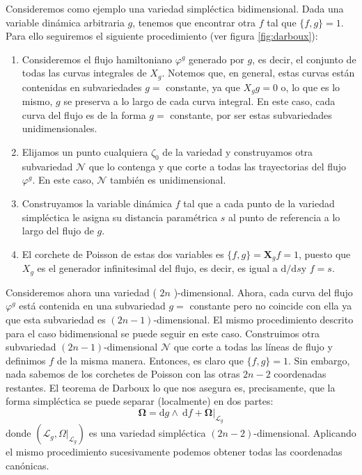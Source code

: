 Consideremos como ejemplo una variedad simpléctica bidimensional. Dada una variable dinámica arbitraria $g$, tenemos que encontrar otra $f$ tal que $\{f, g\}=1$. Para ello seguiremos el siguiente procedimiento (ver figura \ref{fig:darboux}):
\begin{enumerate}
  \item Consideremos el flujo hamiltoniano $\varphi^{g}$ generado por $g$, es decir, el conjunto de todas las curvas integrales de $X_{g}$. Notemos que, en general, estas curvas están contenidas en subvariedades $g=$ constante, ya que $X_{g} g=0$ o, lo que es lo mismo, $g$ se preserva a lo largo de cada curva integral. En este caso, cada curva del flujo es de la forma $g=$ constante, por ser estas subvariedades unidimensionales.
  \item Elijamos un punto cualquiera $\zeta_{0}$ de la variedad y construyamos otra subvariedad $\mathscr{N}$ que lo contenga y que corte a todas las trayectorias del flujo $\varphi^{g}$. En este caso, $\mathscr{N}$ también es unidimensional.
  \item Construyamos la variable dinámica $f$ tal que a cada punto de la variedad simpléctica le asigna su distancia paramétrica $s$ al punto de referencia a lo largo del flujo de $g$.
  \item El corchete de Poisson de estas dos variables es $\{f, g\}=\boldsymbol{X}_{g} f=1$, puesto que $X_{g}$ es el generador infinitesimal del flujo, es decir, es igual a $\mathrm{d} / \mathrm{d} s \mathrm{y}$ $f=s$.
\end{enumerate}


Consideremos ahora una variedad ( $2 n$ )-dimensional. Ahora, cada curva del flujo $\varphi^{g}$ está contenida en una subvariedad $g=$ constante pero no coincide con ella ya que esta subvariedad es $(2 n-1)$-dimensional. El mismo procedimiento descrito para el caso bidimensional se puede seguir en este caso. Construimos otra subvariedad $(2 n-1)$-dimensional $\mathscr{N}$ que corte a todas las líneas de flujo y definimos $f$ de la misma manera. Entonces, es claro que $\{f, g\}=1$. Sin embargo, nada sabemos de los corchetes de Poisson con las otras $2 n-2$ coordenadas restantes. El teorema de Darboux lo que nos asegura es, precisamente, que la forma simpléctica se puede separar (localmente) en dos partes:
$$
\begin{equation*}
\boldsymbol{\Omega}=\mathrm{d} g \wedge \mathrm{~d} f+\left.\boldsymbol{\Omega}\right|_{\mathscr{L}_{g}} \tag{2.9}
\end{equation*}
$$
donde $\left(\mathscr{L}_{g},\left.\Omega\right|_{\mathscr{L}_{g}}\right)$ es una variedad simpléctica  $\left(2 n-2\right)$-dimensional. Aplicando el mismo procedimiento sucesivamente podemos obtener todas las coordenadas canónicas.
